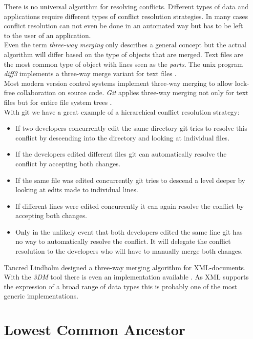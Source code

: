 There is no universal algorithm for resolving conflicts.
Different types of data and applications require different types of conflict resolution strategies.
In many cases conflict resolution can not even be done in an automated way but has to be left to the user of an application.\\
Even the term \emph{three-way merging} only describes a general concept but the actual algorithm will differ based on the type of objects that are merged.
Text files are the most common type of object with lines seen as the \emph{parts}.
The unix program \emph{diff3} implements a three-way merge variant for text files \cite{diff3}.\\
Most modern version control systems implement three-way merging to allow lock-free collaboration on source code.
\emph{Git} applies three-way merging not only for text files but for entire file system trees \cite{git}.\\
With git we have a great example of a hierarchical conflict resolution strategy:

\begin{itemize}
\item If two developers concurrently edit the same directory git tries to resolve this conflict by descending into the directory and looking at individual files.
\item If the developers edited different files git can automatically resolve the conflict by accepting both changes.
\item If the same file was edited concurrently git tries to descend a level deeper by looking at edits made to individual lines.
\item If different lines were edited concurrently it can again resolve the conflict by accepting both changes.
\item Only in the unlikely event that both developers edited the same line git has no way to automatically resolve the conflict.
It will delegate the conflict resolution to the developers who will have to manually merge both changes.
\end{itemize}

Tancred Lindholm designed a three-way merging algorithm for XML-documents.
With the \emph{3DM} tool there is even an implementation available \cite{Lindholm:2001uv}.
As XML supports the expression of a broad range of data types this is probably one of the most generic implementations.

\section{Lowest Common Ancestor}
\label{background.lca}

